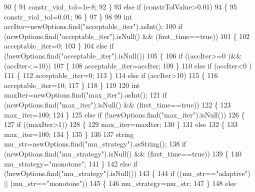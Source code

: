 \begin{DoxyCode}
90         \{
91             constr_viol_tol=1e-8;
92         \}
93         \textcolor{keywordflow}{else} \textcolor{keywordflow}{if} (constrTolValue>0.01)
94         \{
95             constr_viol_tol=0.01;
96         \}
97     \}
98 
99     \textcolor{keywordtype}{int} accIter=newOptions.find(\textcolor{stringliteral}{"acceptable\_iter"}).asInt();
100     \textcolor{keywordflow}{if} (newOptions.find(\textcolor{stringliteral}{"acceptable\_iter"}).isNull() && (first\_time==\textcolor{keyword}{true}))
101     \{
102         acceptable_iter=0;
103     \}
104     \textcolor{keywordflow}{else} \textcolor{keywordflow}{if} (!newOptions.find(\textcolor{stringliteral}{"acceptable\_iter"}).isNull())
105     \{
106         \textcolor{keywordflow}{if} ((accIter>=0 )&& (accIter<=10))
107         \{
108              acceptable_iter=accIter;
109         \}
110         \textcolor{keywordflow}{else} \textcolor{keywordflow}{if} (accIter<0 )
111         \{
112             acceptable_iter=0;
113         \}
114         \textcolor{keywordflow}{else} \textcolor{keywordflow}{if} (accIter>10)
115         \{
116             acceptable_iter=10;
117         \}
118     \}
119 
120     \textcolor{keywordtype}{int} maxIter=newOptions.find(\textcolor{stringliteral}{"max\_iter"}).asInt();
121     \textcolor{keywordflow}{if} (newOptions.find(\textcolor{stringliteral}{"max\_iter"}).isNull() && (first\_time==\textcolor{keyword}{true}))
122     \{
123         max_iter=100;
124     \}
125     \textcolor{keywordflow}{else} \textcolor{keywordflow}{if} (!newOptions.find(\textcolor{stringliteral}{"max\_iter"}).isNull())
126     \{
127         \textcolor{keywordflow}{if} ((maxIter>1))
128         \{
129             max_iter=maxIter;
130         \}
131         \textcolor{keywordflow}{else}
132         \{
133             max_iter=100;
134         \}
135     \}
136 
137     \textcolor{keywordtype}{string} mu\_str=newOptions.find(\textcolor{stringliteral}{"mu\_strategy"}).asString();
138     \textcolor{keywordflow}{if} (newOptions.find(\textcolor{stringliteral}{"mu\_strategy"}).isNull() && (first\_time==\textcolor{keyword}{true}))
139     \{
140         mu_strategy=\textcolor{stringliteral}{"monotone"};
141     \}
142     \textcolor{keywordflow}{else} \textcolor{keywordflow}{if} (!newOptions.find(\textcolor{stringliteral}{"mu\_strategy"}).isNull())
143     \{
144         \textcolor{keywordflow}{if} ((mu\_str==\textcolor{stringliteral}{"adaptive"}) || (mu\_str==\textcolor{stringliteral}{"monotone"}))
145         \{
146             mu_strategy=mu\_str;
147         \}
148         \textcolor{keywordflow}{else}

\end{DoxyCode}
